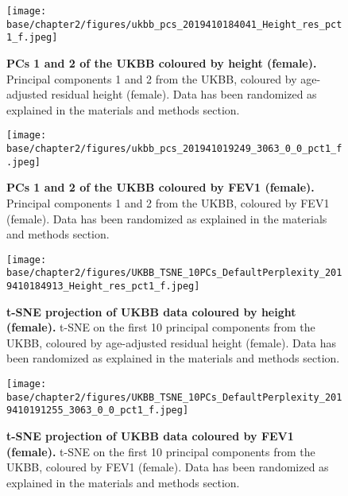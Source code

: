 \newpage

\begin{figure}[ht]
    \centering
    \texttt{[image: base/chapter2/figures/ukbb\_pcs\_2019410184041\_Height\_res\_pct1\_f.jpeg]}
    \caption[PCs 1 and 2 of the UKBB coloured by height (female)]{\textbf{PCs 1 and 2 of the UKBB coloured by height (female).} Principal components 1 and 2 from the UKBB, coloured by age-adjusted residual height (female). Data has been randomized as explained in the materials and methods section.}
    \label{fig:supp_ukbb_pca_height_res_f}
\end{figure}

\newpage

\begin{figure}[ht]
    \centering
    \texttt{[image: base/chapter2/figures/ukbb\_pcs\_201941019249\_3063\_0\_0\_pct1\_f.jpeg]}
    \caption[PCs 1 and 2 of the UKBB coloured by FEV1 (female)]{\textbf{PCs 1 and 2 of the UKBB coloured by FEV1 (female).} Principal components 1 and 2 from the UKBB, coloured by FEV1 (female). Data has been randomized as explained in the materials and methods section.}
    \label{fig:supp_ukbb_pca_fev_f}
\end{figure}

\clearpage
\begin{figure}[ht]
    \centering
    \texttt{[image: base/chapter2/figures/UKBB\_TSNE\_10PCs\_DefaultPerplexity\_2019410184913\_Height\_res\_pct1\_f.jpeg]}
    \caption[t-SNE projection of UKBB data coloured by height (female)]{\textbf{t-SNE projection of UKBB data coloured by height (female).} t-SNE on the first 10 principal components from the UKBB, coloured by age-adjusted residual height (female). Data has been randomized as explained in the materials and methods section.}
    \label{fig:supp_ukbb_tsne_height_res_f}
\end{figure}

\newpage

\begin{figure}[ht]
    \centering
    \texttt{[image: base/chapter2/figures/UKBB\_TSNE\_10PCs\_DefaultPerplexity\_2019410191255\_3063\_0\_0\_pct1\_f.jpeg]}
    \caption[t-SNE projection of UKBB data coloured by FEV1 (female)]{\textbf{t-SNE projection of UKBB data coloured by FEV1 (female).} t-SNE on the first 10 principal components from the UKBB, coloured by FEV1 (female). Data has been randomized as explained in the materials and methods section.}
    \label{fig:supp_ukbb_tsne_fev_f}
\end{figure}

